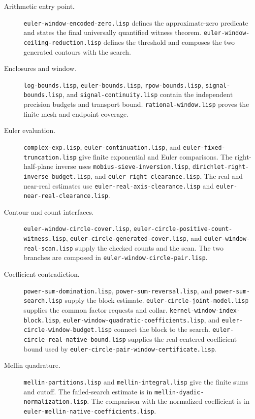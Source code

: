 \documentclass[11pt]{amsart}
\theoremstyle{definition}
\theoremstyle{remark}
\numberwithin{equation}{section}
\newcommand{\code}[1]{\nolinkurl{#1}}
\begin{document}
\begingroup
\raggedright
\begin{description}
\item[Arithmetic entry point.]
 \code{euler-window-encoded-zero.lisp} defines the approximate-zero
 predicate and states the final universally quantified witness
 theorem. \code{euler-window-ceiling-reduction.lisp} defines the
 threshold and composes the two generated contours with the search.

\item[Enclosures and window.]
 \code{log-bounds.lisp}, \code{euler-bounds.lisp},
 \code{rpow-bounds.lisp}, \code{signal-bounds.lisp}, and
 \code{signal-continuity.lisp} contain the independent precision
 budgets and transport bound. \code{rational-window.lisp}
 proves the finite mesh and endpoint coverage.

\item[Euler evaluation.]
 \code{complex-exp.lisp}, \code{euler-continuation.lisp}, and
 \code{euler-fixed-truncation.lisp} give finite exponential and
 Euler comparisons. The right-half-plane inverse uses
 \code{mobius-sieve-inversion.lisp},
 \code{dirichlet-right-inverse-budget.lisp}, and
 \code{euler-right-clearance.lisp}. The real and near-real estimates
 use \code{euler-real-axis-clearance.lisp} and
 \code{euler-near-real-clearance.lisp}.

\item[Contour and count interfaces.]
 \code{euler-window-circle-cover.lisp},
 \code{euler-circle-positive-count-witness.lisp},
 \code{euler-circle-generated-cover.lisp}, and
 \code{euler-window-real-scan.lisp} supply the checked counts and
 the scan. The two branches are composed in
 \code{euler-window-circle-pair.lisp}.

\item[Coefficient contradiction.]
 \code{power-sum-domination.lisp}, \code{power-sum-reversal.lisp},
 and \code{power-sum-search.lisp} supply the block estimate.
 \code{euler-circle-joint-model.lisp} supplies the common factor
 requests and collar. \code{kernel-window-index-block.lisp},
 \code{euler-window-quadratic-coefficients.lisp}, and
 \code{euler-circle-window-budget.lisp} connect the block to the
 search. \code{euler-circle-real-native-bound.lisp} supplies the
 real-centered coefficient bound used by
 \code{euler-circle-pair-window-certificate.lisp}.

\item[Mellin quadrature.]
 \code{mellin-partitions.lisp} and \code{mellin-integral.lisp}
 give the finite sums and cutoff. The failed-search estimate is
 in \code{mellin-dyadic-normalization.lisp}. The comparison with
 the normalized coefficient is in
 \code{euler-mellin-native-coefficients.lisp}.
\end{description}
\endgroup
\end{document}
